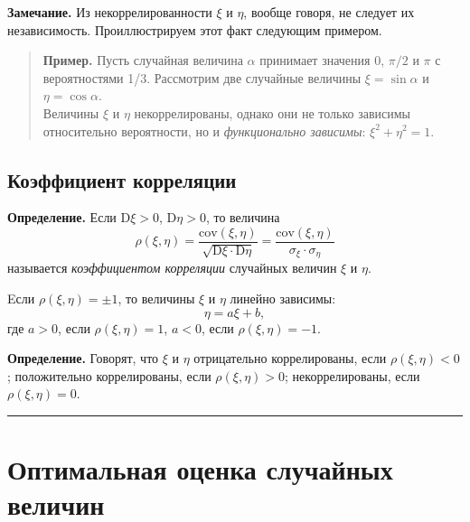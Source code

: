 \documentclass[11pt,a4paper]{article}
\renewcommand{\linethickness}{0.1ex}
\begin{document}
\textbf{Замечание.} Из некоррелированности \(\xi\) и \(\eta\), вообще
говоря, не следует их независимость. Проиллюстрируем этот факт следующим
примером.

\begin{quote}
\textbf{Пример.} Пусть случайная величина \(\alpha\) принимает значения
0, \(\pi/2\) и \(\pi\) с вероятностями 1/3. Рассмотрим две случайные
величины \(\xi = \sin \alpha\) и \(\eta = \cos \alpha\).\\
Величины \(\xi\) и \(\eta\) некоррелированы, однако они не только
зависимы относительно вероятности, но и \emph{функционально зависимы}:
\(\xi^2 + \eta^2 = 1\).
\end{quote}

    \hypertarget{ux43aux43eux44dux444ux444ux438ux446ux438ux435ux43dux442-ux43aux43eux440ux440ux435ux43bux44fux446ux438ux438}{%
\subsection{Коэффициент
корреляции}\label{ux43aux43eux44dux444ux444ux438ux446ux438ux435ux43dux442-ux43aux43eux440ux440ux435ux43bux44fux446ux438ux438}}

\textbf{Определение.} Если \(\mathrm{D}\xi > 0\),
\(\mathrm{D}\eta > 0\), то величина \[
    \rho(\xi, \eta) = \dfrac{\mathrm{cov}(\xi, \eta)}{\sqrt{\mathrm{D}\xi \cdot \mathrm{D}\eta}} = \dfrac{\mathrm{cov}(\xi, \eta)}{\sigma_\xi \cdot \sigma_\eta}
\] называется \emph{коэффициентом корреляции} случайных величин \(\xi\)
и \(\eta\).

Eсли \(\rho(\xi, \eta) = \pm 1\), то величины \(\xi\) и \(\eta\) линейно
зависимы: \[ \eta =a \xi + b, \] где \(a>0\), если
\(\rho(\xi, \eta) = 1\), \(a<0\), если \(\rho(\xi, \eta) = -1\).

\textbf{Определение.} Говорят, что \(\xi\) и \(\eta\) отрицательно
коррелированы, если \(\rho(\xi, \eta) < 0\); положительно коррелированы,
если \(\rho(\xi, \eta) > 0\); некоррелированы, если
\(\rho(\xi, \eta) = 0\).

    \begin{center}\rule{0.5\linewidth}{\linethickness}\end{center}

    \hypertarget{ux43eux43fux442ux438ux43cux430ux43bux44cux43dux430ux44f-ux43eux446ux435ux43dux43aux430-ux441ux43bux443ux447ux430ux439ux43dux44bux445-ux432ux435ux43bux438ux447ux438ux43d}{%
\section{Оптимальная оценка случайных
величин}\label{ux43eux43fux442ux438ux43cux430ux43bux44cux43dux430ux44f-ux43eux446ux435ux43dux43aux430-ux441ux43bux443ux447ux430ux439ux43dux44bux445-ux432ux435ux43bux438ux447ux438ux43d}}
\end{document}
